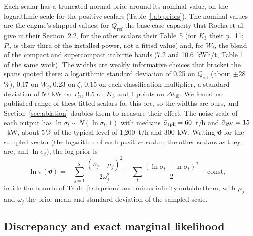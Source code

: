 \documentclass[journal]{IEEEtran}
\newcommand{\pct}{\,\%}
\begin{document}
Each scalar has a truncated normal prior around its nominal value, on the logarithmic scale for the positive scalars
(Table~\ref{tab:priors}). The nominal values are the engine's shipped values: for $Q_{\mathrm{ref}}$ the base-case capacity
that Rocha et al.~\cite{rocha} give in their Section~2.2, for the other scalars their Table~5 (for $K_3$ their p.~11; $P_n$
is their third of the installed power, not a fitted value) and, for $W_i$, the blend of the compact and supercompact itabirite bands (7.2 and 10.6~kWh/t, Table 1 of the same work).
The widths are weakly informative choices that bracket the spans quoted there: a logarithmic standard deviation of 0.25 on
$Q_{\mathrm{ref}}$ (about $\pm28$\pct), 0.17 on $W_i$, 0.23 on $\zeta$, 0.15 on each classification multiplier, a
standard deviation of 50~kW on $P_n$, 0.5 on $K_3$ and 4 points on $\Delta t_{10}$. We found no published range of these
fitted scalars for this ore, so the widths are ours, and Section~\ref{sec:ablation} doubles them to measure their effect.
The noise scale of each output has $\ln\sigma_t\sim N(\ln\bar\sigma_t,1)$ with medians $\bar\sigma_{\mathrm{tph}}=60$~t/h and
$\bar\sigma_{\mathrm{kW}}=15$~kW, about 5\pct{} of the typical level of 1,200~t/h and 300~kW. Writing $\boldsymbol\vartheta$ for
the sampled vector (the logarithm of each positive scalar, the other scalars as they are, and $\ln\sigma_t$), the log prior is
\begin{equation}
\ln\pi(\boldsymbol\vartheta)=-\sum_{j=1}^{8}\frac{(\vartheta_j-\mu_j)^2}{2\omega_j^2}-\sum_{t}\frac{(\ln\sigma_t-\ln\bar\sigma_t)^2}{2}+\text{const},
\label{eq:prior}
\end{equation}
inside the bounds of Table~\ref{tab:priors} and minus infinity outside them, with $\mu_j$ and $\omega_j$ the prior mean and
standard deviation of the sampled scale.

\begin{table}[!t]
\caption{Priors of the eight engine scalars of the HP500 lane, with the engine's nominal value (the prior median), the prior on the sampled scale and its truncation range; the sampled scale is the natural logarithm for the positive scalars.}
\label{tab:priors}
\centering\footnotesize
\resizebox{\columnwidth}{!}{}
\end{table}

\subsection{Discrepancy and exact marginal likelihood}
\end{document}
